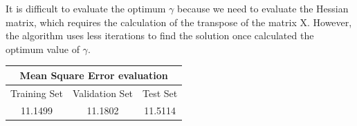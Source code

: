 \documentclass[12pt,a4paper,oneside]{article}
\begin{document}
	It is difficult to evaluate the optimum $\gamma$ because we need to evaluate the Hessian matrix, which requires the calculation of the transpose of the matrix X. However, the algorithm uses less iterations to find the solution once calculated the optimum value of $\gamma$.
	
	\begin{center}
		\begin{tabular}{ccc}	
			\toprule 
			\multicolumn{3}{c}{\textbf{Mean Square Error evaluation}} \\ 
			\midrule 
			Training Set & Validation Set & Test Set \\ 
			\midrule 
			 11.1499 & 11.1802 & 11.5114  \\ 
			\bottomrule 
		\end{tabular} 
	\end{center}
	
\end{document}
